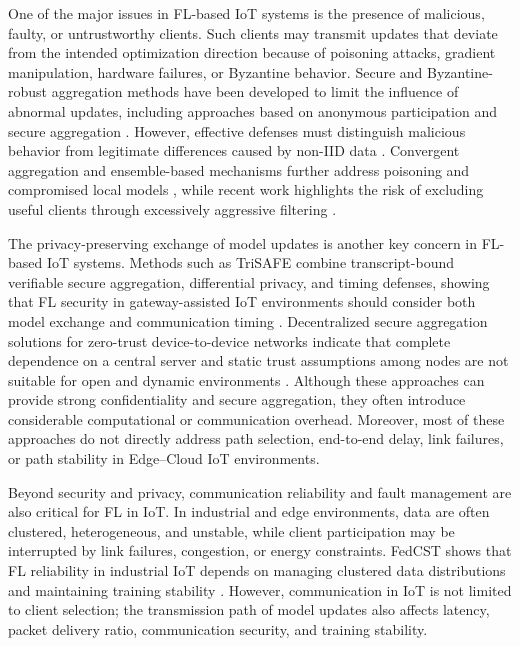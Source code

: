\documentclass[5p,times,numafflabel]{elsarticle}
\begin{document}
One of the major issues in FL-based IoT systems is the presence of
malicious, faulty, or untrustworthy clients. Such clients may transmit
updates that deviate from the intended optimization direction because
of poisoning attacks, gradient manipulation, hardware failures, or
Byzantine behavior. Secure and Byzantine-robust aggregation methods
have been developed to limit the influence of abnormal updates,
including approaches based on anonymous participation and secure
aggregation \cite{liu2026anonymous}. However, effective defenses
must distinguish malicious behavior from legitimate differences caused
by non-IID data \cite{zhu2026bpflh}. Convergent aggregation and
ensemble-based mechanisms further address poisoning and compromised
local models \cite{zhang2026endpca}, while recent work highlights
the risk of excluding useful clients through excessively aggressive
filtering \cite{zhang2026malicious}.
	
	The privacy-preserving exchange of model updates is another key
	concern in FL-based IoT systems. Methods such as TriSAFE combine
	transcript-bound verifiable secure aggregation, differential privacy,
	and timing defenses, showing that FL security in gateway-assisted IoT
	environments should consider both model exchange and communication
	timing \cite{shah2026trisafe}. Decentralized secure aggregation
	solutions for zero-trust device-to-device networks indicate that
	complete dependence on a central server and static trust assumptions
	among nodes are not suitable for open and dynamic environments
	\cite{wang2026desa}. Although these approaches can provide strong
	confidentiality and secure aggregation, they often introduce
	considerable computational or communication overhead. Moreover, most
	of these approaches do not directly address path selection,
	end-to-end delay, link failures, or path stability in Edge--Cloud IoT
	environments.
	
	Beyond security and privacy, communication reliability and fault
	management are also critical for FL in IoT. In industrial and edge
	environments, data are often clustered, heterogeneous, and unstable,
	while client participation may be interrupted by link failures,
	congestion, or energy constraints. FedCST shows that FL reliability in
	industrial IoT depends on managing clustered data distributions and
	maintaining training stability \cite{tang2026fedcst}. However,
	communication in IoT is not limited to client selection; the
	transmission path of model updates also affects latency, packet
	delivery ratio, communication security, and training stability.
	
\end{document}
